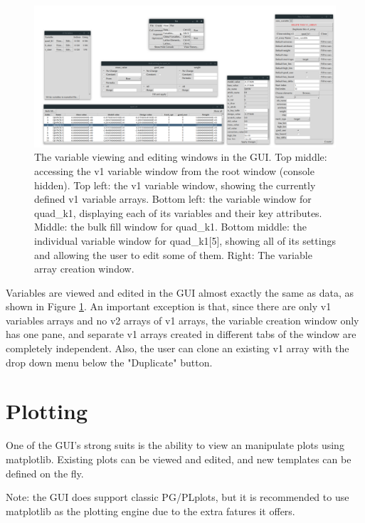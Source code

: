 \begin{figure}
\centering
\includegraphics[width=12cm]{figures/variables.pdf}
\caption[The variable viewing and editing windows in the GUI.]{The variable viewing and editing windows in the GUI.
Top middle: accessing the v1 variable window from the root window (console hidden).
Top left: the v1 variable window, showing the currently defined v1 variable arrays.
Bottom left: the variable window for quad_k1, displaying each of its variables and their key attributes.
Middle: the bulk fill window for quad_k1.
Bottom middle: the individual variable window for quad_k1[5], showing all of its settings and allowing the user to edit some of them.
Right: The variable array creation window.}
\label{fig:gui.variables}
\end{figure}

Variables are viewed and edited in the GUI almost exactly the same as data, as shown in Figure \ref{fig:gui.variables}.
An important exception is that, since there are only v1 variables arrays and no v2 arrays of v1 arrays, the variable creation window only has one pane, and separate v1 arrays created in different tabs of the window are completely independent.
Also, the user can clone an existing v1 array with the drop down menu below the "Duplicate" button.

\section{Plotting}
\label{s:gui.plot}

One of the GUI's strong suits is the ability to view an manipulate plots using matplotlib.
Existing plots can be viewed and edited, and new templates can be defined on the fly.

Note: the GUI does support classic PG/PLplots, but it is recommended to use matplotlib as the plotting engine due to the extra fatures it offers.

